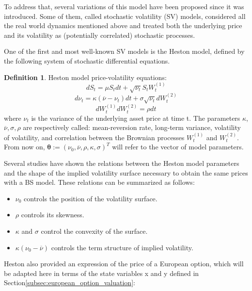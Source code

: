 \documentclass[12,twoside]{mammeTFM}
\theoremstyle{definition}
\newtheorem{definition}[thm]{Definition}
\theoremstyle{remark}
\begin{document}
To address that, several variations of this model have been proposed since it was introduced. Some of them, called stochastic volatility (SV) models, considered all the real world dynamics mentioned above and treated both the underlying price and its volatility as (potentially correlated) stochastic processes.

One of the first and most well-known SV models is the Heston model, defined by the following system of stochastic differential equations.

\begin{definition} Heston model price-volatility equations:
$$
dS_t = \mu S_t dt + \sqrt{\nu_t} S_t W_t^{(1)}
$$
$$
d\nu_t = \kappa(\overline{\nu} - \nu_t) dt + \sigma \sqrt{\nu_t}dW_t^{(2)}
$$
$$
dW_t^{(1)}dW_t^{(2)} = \rho dt
$$
where $\nu_t$ is the variance of the underlying asset price at time t. The parameters $\kappa$, $\overline{\nu}, \sigma, \rho$ are respectively called: mean-reversion rate, long-term variance, volatility of volatility, and correlation between the Brownian processes $W_t^{(1)}$ and $W_t^{(2)}$. From now on, $\boldsymbol{\theta} := (\nu_0, \overline{\nu}, \rho, \kappa, \sigma)^T$ will refer to the vector of model parameters.
\end{definition}

Several studies have shown the relations between the Heston model parameters and the shape of the implied volatility surface \cite{cla11, gat06, gil12, jan11} necessary to obtain the same prices with a BS model. These relations can be summarized as follows:

\begin{itemize} \label{hes_param_properties}
\item $\nu_0$ controls the position of the volatility surface.
\item $\rho$ controls its skewness.
\item $\kappa$ and $\sigma$ control the convexity of the surface.
\item $\kappa(\nu_0 - \overline{\nu})$ controls the term structure of implied volatility.
\end{itemize}

Heston also provided an expression of the price of a European option, which will be adapted here in terms of the state variables x and y defined in Section\ref{subsec:european_option_valuation}:
\end{document}
